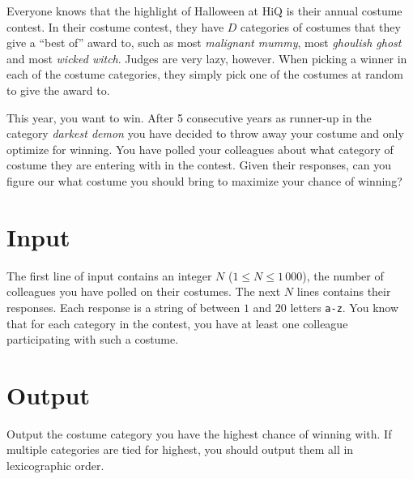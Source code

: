 
\noindent
Everyone knows that the highlight of Halloween at HiQ is their annual costume contest.
In their costume contest, they have $D$ categories of costumes that they give a ``best of'' award to, such as most \emph{malignant mummy}, most \emph{ghoulish ghost} and most \emph{wicked witch}.
Judges are very lazy, however.
When picking a winner in each of the costume categories, they simply pick one of the costumes at random to give the award to.

This year, you want to win.
After 5 consecutive years as runner-up in the category \emph{darkest demon} you have decided to throw away your costume and only optimize for winning.
You have polled your colleagues about what category of costume they are entering with in the contest.
Given their responses, can you figure our what costume you should bring to maximize your chance of winning?

\section*{Input}
The first line of input contains an integer $N$ ($1 \le N \le 1\,000$), the number of colleagues you have polled on their costumes.
The next $N$ lines contains their responses.
Each response is a string of between $1$ and $20$ letters \texttt{a-z}.
You know that for each category in the contest, you have at least one colleague participating with such a costume.

\section*{Output}
Output the costume category you have the highest chance of winning with.
If multiple categories are tied for highest, you should output them all in lexicographic order.
